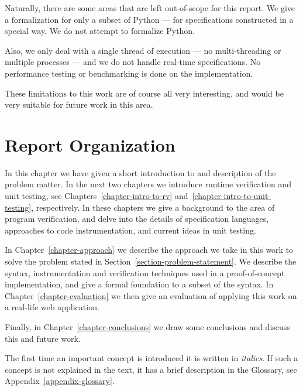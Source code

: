 Naturally, there are some areas that are left out-of-scope for this report. We
give a formalization for only a subset of Python --- for specifications
constructed in a special way. We do not attempt to formalize Python.

Also, we only deal with a single thread of execution --- no multi-threading or
multiple processes --- and we do not handle real-time specifications. No
performance testing or benchmarking is done on the implementation.

These limitations to this work are of course all very interesting, and would be
very suitable for future work in this area.


\section{Report Organization}

In this chapter we have given a short introduction to and description of the
problem matter. In the next two chapters we introduce runtime verification and
unit testing, see Chapters~\ref{chapter-intro-to-rv}
and~\ref{chapter-intro-to-unit-testing}, respectively. In these chapters we
give a background to the area of program verification, and delve into the
details of specification languages, approaches to code instrumentation, and
current ideas in unit testing.

In Chapter~\ref{chapter-approach} we describe the approach we take in this work to
solve the problem stated in Section~\ref{section-problem-statement}. We
describe the syntax, instrumentation and verification techniques used in a
proof-of-concept implementation, and give a formal foundation to a subset of
the syntax. In Chapter~\ref{chapter-evaluation} we then give an evaluation of
applying this work on a real-life web application.

Finally, in Chapter~\ref{chapter-conclusions} we draw some conclusions and
discuss this and future work.

The first time an important concept is introduced it is written in
\textit{italics}. If such a concept is not explained in the text, it has a
brief description in the Glossary, see Appendix~\ref{appendix-glossary}.
